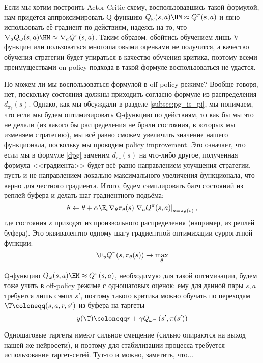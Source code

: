 Если мы хотим построить Actor-Critic схему, воспользовавшись такой формулой, нам придётся аппроксимировать Q-функцию $Q_\omega(s, a) \HM \approx Q^\pi(s, a)$ и явно использовать её градиент по действиям, надеясь на то, что $\nabla_a Q_\omega(s, a) \HM\approx \nabla_a Q^\pi(s, a)$. Таким образом, обойтись обучением лишь V-функции или пользоваться многошаговыми оценками не получится, а качество обучения стратегии будет упираться в качество обучения критика, поэтому всеми преимуществами on-policy подхода в такой формуле воспользоваться не удастся.

Но можем ли мы воспользоваться формулой в off-policy режиме? Вообще говоря, нет, поскольку состояния должны приходить согласно формуле из распределения $d_{\pi_\theta}(s)$. Однако, как мы обсуждали в разделе \ref{subsec:pg_is_pi}, мы понимаем, что если мы будем оптимизировать Q-функцию по действиям, то как бы мы это не делали (из какого бы распределения не брали состояния, в которых мы изменяем стратегию), мы всё равно сможем увеличить значение нашего функционала, поскольку мы проводим policy improvement. Это означает, что если мы в формуле \eqref{dpg} заменим $d_{\pi_\theta}(s)$ на что-либо другое, полученная формула <<градиента>> будет всё равно направлением улучшения стратегии, пусть и не направлением локально максимального увеличения функционала, что верно для честного градиента. Итого, будем сэмплировать батч состояний из реплей буфера и делать шаг градиентного подъёма: 
$$\theta \leftarrow \theta + \alpha \E_{s} \nabla_\theta \pi_\theta(s) \left. \nabla_a Q^{\pi}(s, a) \right|_{a = \pi_\theta(s)},$$
где состояния $s$ приходят из произвольного распределения (например, из реплей буфера). Это эквивалентно одному шагу градиентной оптимизации суррогатной функции:
\begin{equation}\label{ddpg_actor}
\E_s Q^{\pi}(s, \pi_{\theta}(s)) \to \max_{\theta}
\end{equation}

Q-функцию $Q_\omega(s, a) \HM \approx Q^\pi(s, a)$, необходимую для такой оптимизации, будем тоже учить в off-policy режиме с одношаговых оценок: ему для данной пары $s,a$ требуется лишь сэмпл $s'$, поэтому такого критика можно обучать по переходам $\T \coloneqq (s, a, r, s')$ из буфера на таргеты
$$y(\T) \coloneqq r + \gamma Q_{\omega^{-}}\left( s', \pi(s') \right)$$

Одношаговые таргеты имеют сильное смещение (сильно опираются на выход нашей же нейросети), и поэтому для стабилизации процесса требуется использование таргет-сетей. Тут-то и можно, заметить, что...

